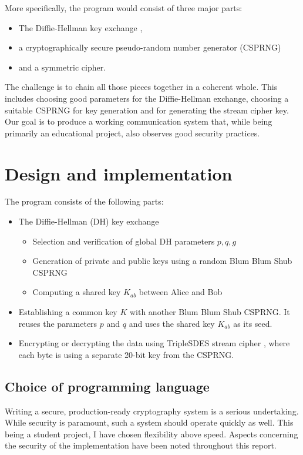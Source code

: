 \documentclass[a4paper,english,12pt]{article}
\begin{document}
More specifically, the program would consist of three major parts:
\begin{itemize}
  \item The Diffie-Hellman key exchange \cite{dh},
  \item a cryptographically secure pseudo-random number generator (CSPRNG)
  \item and a symmetric cipher.
\end{itemize}

The challenge is to chain all those pieces together in a coherent whole.  This
includes choosing good parameters for the Diffie-Hellman exchange, choosing a
suitable CSPRNG for key generation and for generating the stream cipher key.
Our goal is to produce a working communication system that, while being
primarily an educational project, also observes good security practices.

\section{Design and implementation}
The program consists of the following parts:
\begin{itemize}
  \item The Diffie-Hellman \cite{dh} (DH) key exchange
    \begin{itemize}
      \item Selection and verification of global DH parameters $p, q, g$
      \item Generation of private and public keys using a random Blum Blum Shub CSPRNG
      \item Computing a shared key $K_{ab}$ between Alice and Bob
    \end{itemize}
  \item Establishing a common key $K$ with another Blum Blum Shub CSPRNG. It
    reuses the parameters $p$ and $q$ and uses the shared key $K_{ab}$ as its
    seed.
  \item Encrypting or decrypting the data using TripleSDES stream cipher
    \cite{sdes}, where each byte is using a separate 20-bit key from the
    CSPRNG.
\end{itemize}

\subsection{Choice of programming language}
Writing a secure, production-ready cryptography system is a serious
undertaking. While security is paramount, such a system should operate quickly
as well. This being a student project, I have chosen flexibility above
speed. Aspects concerning the security of the implementation have been noted
throughout this report.
\end{document}
